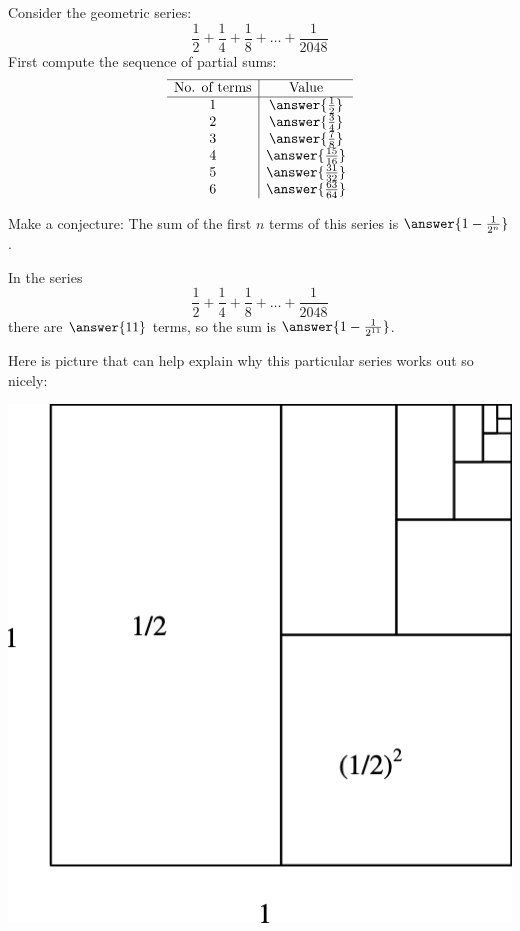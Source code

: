 \documentclass[nooutcomes]{ximera}
\begin{document}
\begin{problem}
Consider the geometric series: 
\[
\frac{1}{2}+\frac{1}{4}+\frac{1}{8}+\dots+\frac{1}{2048}
\]
First compute the sequence of partial sums: 
\[
\begin{array}{c|c} \hline
\text{No. of terms} & \text{Value} \\ \hline
1 & \answer{\frac{1}{2}} \\
2 & \answer{\frac{3}{4}} \\
3 & \answer{\frac{7}{8}}\\
4 & \answer{\frac{15}{16}}\\
5 & \answer{\frac{31}{32}}\\
6 & \answer{\frac{63}{64}}\\
\end{array}
\]
\begin{problem}
Make a conjecture: The sum of the first $n$ terms of this series is $\answer{1-\frac{1}{2^n}}$. 

In the series
\[
\frac{1}{2}+\frac{1}{4}+\frac{1}{8}+\dots+\frac{1}{2048}
\]
there are $\answer{11}$ terms, so the sum is $\answer{1-\frac{1}{2^{11}}}$.  

\begin{problem}

Here is picture that can help explain why this particular series works out so nicely: 
\begin{image}
\includegraphics{pbpsqgeo.png}
\end{image}


\end{problem}
\end{problem}
\end{problem}
\end{document}
